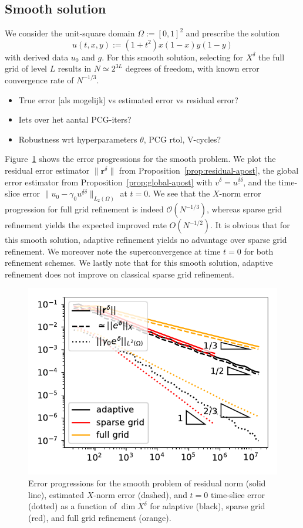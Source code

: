 \documentclass[11pt,a4paper,oneside,english]{amsart}
\numberwithin{equation}{section}
\numberwithin{theorem}{section}
\theoremstyle{definition}
\newcommand{\udelta}{{\underline{\delta}}}
\newcommand{\jw}[1]{{\color{red}{JW: #1}}}
\begin{document}
\subsection{Smooth solution}
We consider the unit-square domain $\Omega := [0,1]^2$ and prescribe the solution
\[
  u(t,x,y) := (1 + t^2) x (1-x) y (1-y)
\]
with derived data $u_0$ and $g$. For this smooth solution, selecting for $X^\delta$
the full grid of level $L$ results in $N \simeq 2^{3L}$ degrees of freedom, with
known error convergence rate of $N^{-1/3}$.\jw{citatie}
\begin{itemize}
  \item True error [als mogelijk] vs estimated error vs residual error?
  \item Iets over het aantal PCG-iters?
  \item Robustness wrt hyperparameters $\theta$, PCG rtol, V-cycles?
\end{itemize}

Figure~\ref{fig:smooth} shows the error progressions for the smooth problem. We
plot the residual error estimator $\|\mathbf r^{\delta}\|$ from Proposition~\ref{prop:residual-apost},
the global error estimator from Proposition~\ref{prop:global-apost} with $v^\delta=u^{\udelta \delta}$,
and the time-slice error $\|u_0 - \gamma_0 u^{\udelta \delta}\|_{L_2(\Omega)}$ at $t=0$.\jw{misschien ook de $X$-norm meten?}
We see that the $X$-norm error progression for full grid refinement is indeed $\mathcal O(N^{-1/3})$,
whereas sparse grid refinement yields the expected improved\jw{cite} rate $O(N^{-1/2})$.
It is obvious that for this smooth solution, adaptive refinement yields no advantage over sparse grid refinement.
We moreover note the superconvergence at time $t=0$ for both refinement schemes.
We lastly note that for this smooth solution, adaptive refinement does not improve
on classical sparse grid refinement.

\begin{figure}
  \includegraphics[width=0.5\linewidth]{smooth_adaptive_errors}
  \caption{Error progressions for the smooth problem of residual norm (solid line),
  estimated $X$-norm error (dashed), and $t=0$ time-slice error (dotted) as a function
  of $\dim X^\delta$ for adaptive (black), sparse grid (red), and full grid refinement (orange).}
  \label{fig:smooth}
\end{figure}
\end{document}
